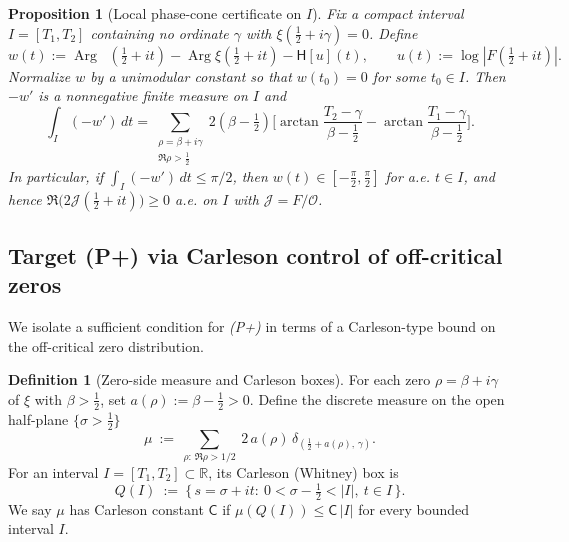 \documentclass[11pt]{article}
\newtheorem{proposition}[theorem]{Proposition}
\theoremstyle{definition}
\newtheorem{definition}[theorem]{Definition}
\theoremstyle{remark}
\newcommand{\R}{\mathbb{R}}
\DeclareMathOperator{\dettwo}{det_2}
\DeclareMathOperator{\Arg}{Arg}
\begin{document}
\begin{proposition}[Local phase-cone certificate on \(I\)]
Fix a compact interval $I=[T_1,T_2]$ containing no ordinate \(\gamma\) with \(\xi(\tfrac12+i\gamma)=0\). Define
\[
 w(t):=\Arg\dettwo(\tfrac12+it)-\Arg\xi(\tfrac12+it)-\mathsf H[u](t),\qquad u(t):=\log|F(\tfrac12+it)|.
\]
Normalize $w$ by a unimodular constant so that $w(t_0)=0$ for some $t_0\in I$. Then $-w'$ is a nonnegative finite measure on $I$ and
\[
 \int_I (-w')\,dt=\sum_{\substack{\rho=\beta+i\gamma\\ \Re\rho>\tfrac12}}\! 2(\beta-\tfrac12)\Big[\arctan\frac{T_2-\gamma}{\beta-\tfrac12}-\arctan\frac{T_1-\gamma}{\beta-\tfrac12}\Big].
\]
In particular, if \(\displaystyle \int_I (-w')\,dt\le \pi/2\), then $w(t)\in[-\tfrac\pi2,\tfrac\pi2]$ for a.e. $t\in I$, and hence \(\Re\big(2\mathcal J(\tfrac12+it)\big)\ge 0\) a.e. on $I$ with \(\mathcal J=F/\mathcal O\).
\end{proposition}
\subsection*{Target (P+) via Carleson control of off-critical zeros}\label{subsec:Pplus-Carleson}
We isolate a sufficient condition for \emph{(P+)} in terms of a Carleson-type bound on the off-critical zero distribution.
\begin{definition}[Zero-side measure and Carleson boxes]
For each zero \(\rho=\beta+i\gamma\) of \(\xi\) with \(\beta>\tfrac12\), set \(a(\rho):=\beta-\tfrac12>0\). Define the discrete measure on the open half-plane \(\{\sigma>\tfrac12\}\)
\[
 \mu\ :=\ \sum_{\rho:\,\Re\rho>1/2}\ 2\,a(\rho)\,\delta_{(\tfrac12+a(\rho),\,\gamma)}.
\]
For an interval \(I=[T_1,T_2]\subset\R\), its Carleson (Whitney) box is
\[
 Q(I)\ :=\ \Big\{\, s=\sigma+it:\ 0<\sigma-\tfrac12<|I|,\ t\in I\,\Big\}.
\]
We say \(\mu\) has Carleson constant \(\mathsf C\) if \(\mu(Q(I))\le \mathsf C\,|I|\) for every bounded interval \(I\).
\end{definition}
\end{document}
